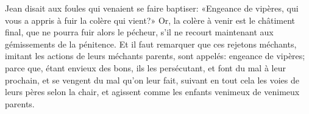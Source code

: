 Jean disait aux foules qui venaient se faire baptiser:
	«Engeance de vipères, qui vous a appris à fuir la colère qui vient?»
Or, la colère à venir est le châtiment final,
	que ne pourra fuir alors le pécheur,
	s’il ne recourt maintenant aux gémissements de la pénitence.
Et il faut remarquer que ces rejetons méchants,
	imitant les actions de leurs méchants parents,
	sont appelés: engeance de vipères;
	parce que, étant envieux des bons, ils les persécutant,
	et font du mal à leur prochain, et se vengent du mal qu’on leur fait,
	suivant en tout cela les voies de leurs pères selon la chair,
	et agissent comme les enfants venimeux de venimeux parents.
